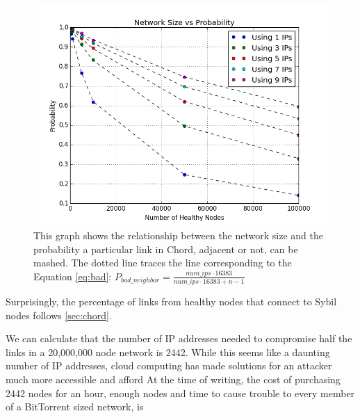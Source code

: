 \documentclass[11pt,conference]{IEEEtran}
\begin{document}
\begin{figure}
    \centering
    \includegraphics[width=\linewidth]{size_occlusion_chord}
    \caption{This graph shows the relationship between the network size and the probability a particular link in Chord, adjacent or not, can be mashed.
        The dotted line traces the line corresponding to the Equation \ref{eq:bad}: $ P_{bad\_neighbor} =  \frac{num\_ips \cdot 16383}{num\_ips \cdot 16383 + n - 1}$}
    
    \label{fig:exp3}
\end{figure}



Surprisingly, the percentage of links from healthy nodes that connect to Sybil nodes follows \ref{sec:chord}.


We can calculate that the number of IP addresses needed to compromise half the links in a 20,000,000 node network is 2442.
While this seems like a daunting number of IP addresses, cloud computing has made solutions for an attacker much more accessible and afford
At the time of writing, the cost of purchasing 2442 nodes for an hour, enough nodes and time to cause trouble to every member of a BitTorrent sized network, is 





\end{document}
